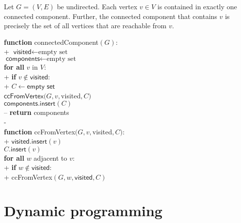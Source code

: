\documentclass{article}
\begin{document}
\begin{corollary}
	Let $G=(V,E)$ be undirected. Each vertex $v\in V$ is contained in exactly
	one connected component. Further, the connected component that contains $v$
	is precisely the set of all vertices that are reachable from $v$. 
\end{corollary}

\begin{pseudo}
\textbf{function} \textsf{connectedComponent}$(G)$:									\\+
	$\textsf{visited}\leftarrow\text{empty set}$									\\
	$\textsf{components}\leftarrow\text{empty set}$									\\
	\textbf{for all} $v$ in $V$:													\\+
		\textbf{if} $v\not\in\textsf{visited}$:										\\+
			$C\leftarrow\textsf{empty set}$											\\
			$\textsf{ccFromVertex}(G, v, $\textsf{visited}$, C)$					\\
			$\textsf{components}.\textsf{insert}(C)$								\\--
	\textbf{return} \textsf{components}												\\-
																					\\
\textbf{function} \textsf{ccFromVertex}$(G, v, $\textsf{visited}$, C)$:				\\+
    $\textsf{visited}.\textsf{insert}(v)$											\\
	$C.\textsf{insert}(v)$															\\
    \textbf{for all} $w$ adjacent to $v$:											\\+
		\textbf{if} $w\not\in\textsf{visited}$:										\\+
			\textsf{ccFromVertex}$(G, w, \textsf{visited}, C)$
\end{pseudo}
	
\section{Dynamic programming}
\end{document}
